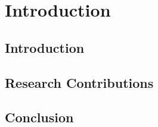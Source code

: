 \chapter{Introduction}

\section{Introduction}



\section{Research Contributions}



\section{Conclusion}

